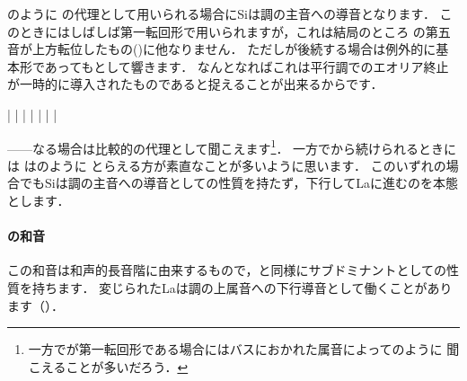 \documentclass[dvipdfmx,uplatex,b5paper,openany,jbase=12Q,nomag*,textwidth-limit=44%
               ]{gachimuchi}
\begin{document}
のように
の代理として用いられる場合にSiは調の主音への導音となります．
このときにはしばしば第一転回形で用いられますが，これは結局のところ
の第五音が上方転位したもの()に他なりません．
ただしが後続する場合は例外的に基本形であってもとして響きます．
なんとなればこれは平行調でのエオリア終止が一時的に導入されたものであると捉えることが出来るからです．

\begin{floatMusic}[pos=ht]
  \Startpiece%
  \znotes|\en
  \NOTes
  |%
  \en\bar
  \NOTes
  \Mryaku\sk%
  |\Mryaku\sk%
  \en\doublebar
  \NOTes
  |%
  \en\bar
  \NOTes
  \Mryaku\sk%
  |\Mryaku\sk%
  \en\setdoublebar
  \endpiece%
\end{floatMusic}

------なる場合は比較的の代理として聞こえます\footnote{
  一方で\Gniii\Min が第一転回形である場合にはバスにおかれた属音によってのように
  聞こえることが多いだろう．
}．
一方でから続けられるときには
\Gniii\Min はのように
とらえる方が素直なことが多いように思います．
このいずれの場合でもSiは調の主音への導音としての性質を持たず，下行してLaに進むのを本態とします．


\paragraph{\Gniv\Min の和音}
この和音は和声的長音階に由来するもので，\Gniv と同様にサブドミナントとしての性質を持ちます．
変じられたLa\aFlat は調の上属音への下行導音として働くことがあります（）．
\end{document}
